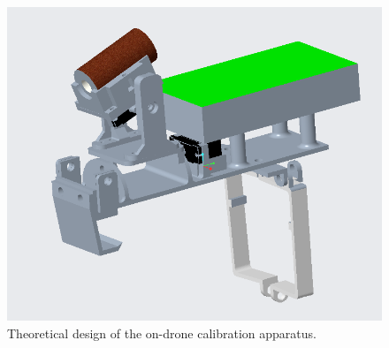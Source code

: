 \begin{figure}[H]
 \centering
 \includegraphics[scale=0.35, angle = 0]{./pictures/teoreticalDesign.png}
 \caption{Theoretical design of the on-drone calibration apparatus.}
 \label{Drone}
 
\end{figure}







